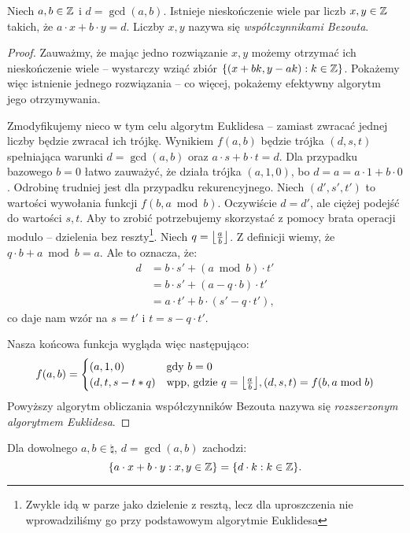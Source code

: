 \begin{theorem}
	\label{nt:bezout}
	Niech \(a, b \in \mathbb{Z}\) i \(d = \gcd(a, b)\). Istnieje nieskończenie
	wiele par liczb \(x, y \in \mathbb{Z}\) takich, że \(a \cdot x + b \cdot y = d\).
	Liczby \(x, y\) nazywa się \textit{współczynnikami Bezouta}.
\end{theorem}
\begin{proof}
	Zauważmy, że mając jedno rozwiązanie \(x, y\) możemy otrzymać ich nieskończenie wiele --
	wystarczy wziąć zbiór \(\set{(x+bk, y-ak) : k \in \integer}\). Pokażemy więc istnienie jednego
	rozwiązania -- co więcej, pokażemy efektywny algorytm jego otrzymywania.

	Zmodyfikujemy nieco w tym celu algorytm Euklidesa -- zamiast zwracać jednej liczby będzie zwracał ich trójkę.
	Wynikiem \(f(a, b)\) będzie trójka \((d, s, t)\) spełniająca warunki \(d = \gcd(a, b)\) oraz \(a \cdot s + b \cdot t = d\).
	Dla przypadku bazowego \(b = 0\) łatwo zauważyć, że działa trójka \((a, 1, 0)\), bo \(d = a = a \cdot 1 + b \cdot 0\).
	Odrobinę trudniej jest dla przypadku rekurencyjnego. Niech \((d', s', t')\) to wartości wywołania funkcji
	\(f(b, a \bmod b)\). Oczywiście \(d = d'\), ale ciężej podejść do wartości \(s, t\). Aby to zrobić potrzebujemy
	skorzystać z pomocy brata operacji modulo -- dzielenia bez reszty\footnote{Zwykle idą w parze jako dzielenie z resztą, lecz dla uproszczenia nie wprowadziliśmy go przy podstawowym algorytmie Euklidesa}.
	Niech \(q = \left\lfloor\frac{a}{b}\right\rfloor\). Z definicji wiemy, że \(q \cdot b + a \bmod b = a\). Ale to oznacza, że:
	\begin{align*}
		d & = b \cdot s' + (a \bmod b) \cdot t'       \\
		  & = b \cdot s' + (a - q \cdot b) \cdot t'   \\
		  & = a \cdot t' + b \cdot (s' - q \cdot t'),
	\end{align*}
	co daje nam wzór na \(s = t'\) i \(t = s - q \cdot t'\).

	Nasza końcowa funkcja wygląda więc następująco:
	\begin{equation*}
		f(a, b) = \begin{cases}
			(a, 1, 0)         & \text{gdy } b = 0 \\
			(d, t, s - t * q) & \text {wpp, gdzie } q = \floor{\frac{a}{b}}, (d, s, t) = f(b, a \bmod b)
		\end{cases}
	\end{equation*}
	Powyższy algorytm obliczania współczynników Bezouta nazywa się \textit{rozszerzonym algorytmem Euklidesa}.
\end{proof}

\begin{corollary}
	Dla dowolnego \(a, b \in \natural\), \(d = \gcd(a, b)\) zachodzi:
	\begin{equation*}
		\set{a \cdot x + b \cdot y : x, y \in \integer} = \set{d \cdot k : k \in \integer}.
	\end{equation*}
\end{corollary}
